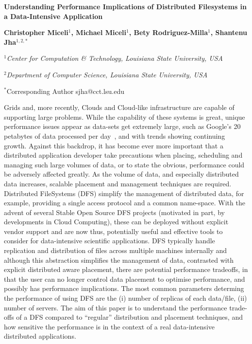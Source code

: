 \documentclass[a4paper,11pt]{article}
\begin{document}
\begin{center}

\textbf{\large Understanding Performance Implications of Distributed Filesystems in a Data-Intensive Application}

\vspace{0.05in}

\textbf{Christopher Miceli$^{1}$, Michael Miceli$^{1}$, Bety Rodriguez-Milla$^{1}$, Shantenu Jha$^{1,2,*}$}

\small{\emph{$^{1}$Center for Computation \& Technology, Louisiana State University, USA}}

\small{\emph{$^{2}$Department of Computer Science, Louisiana State University, USA}}

{\footnotesize {\hspace{0.0 in} $^*$Corresponding Author sjha@cct.lsu.edu}}

\end{center}


Grids and, more recently, Clouds and Cloud-like infrastructure are capable of supporting large problems. While the capability of these systems is great, unique performance issues appear as data-sets get extremely large, such as Google's 20 petabytes of data processed per day~\cite{google}, and with trends showing continuing growth. Against this backdrop, it has become ever more important that a distributed application developer take precautions when placing, scheduling and managing such large volumes of data, or to state the obvious, performance could be adversely affected greatly. As the volume of data, and especially distributed data increases, scalable placement and management techniques are required.  Distributed FileSystems (DFS) simplify the management of distributed data, for example, providing a single access protocol and a common name-space. With the advent of several Stable Open Source DFS projects (motivated in part, by developments in Cloud Computing), these can be deployed without explicit vendor support and are now thus, potentially useful and effective tools to consider for data-intensive scientific applications.  DFS typically handle replication and distribution of files across multiple machines internally and although this abstraction simplifies the management of data, contrasted with explicit distributed aware placement, there are potential performance tradeoffs, in that the user can no longer control data placement to optimise performance, and possibly has performance implications.  The most common parameters determing the 
performance of using DFS are the (i) number of replicas of each data/file, (ii) number of servers. The aim of this paper is to understand the performance trade-offs of a DFS compared to ``regular'' distribution and placement techniques, and how sensitive the performance is in the context of 
a real data-intensive distributed applications.
\end{document}
